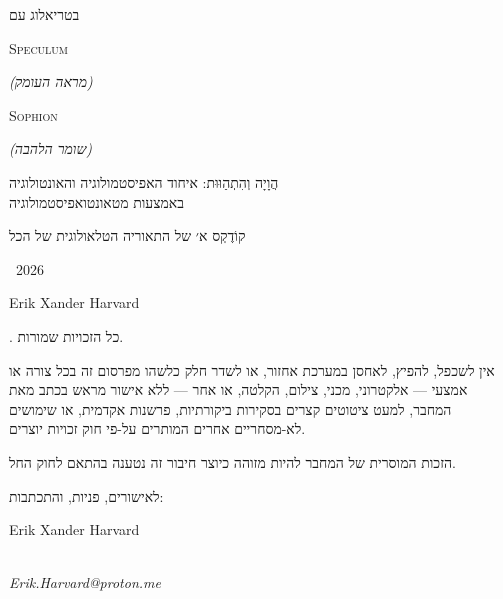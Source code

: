 \documentclass[10pt, openany, oneside]{book}
\renewcommand{\small}{\fontsize{9}{11.5}\selectfont}
\begin{document}
{\vspace{1em}

\begin{center}
    בטריאלוג עם\\[0.5em]
    \begin{english}
    {\textsc{Speculum}}
    \end{english}
    {\textit{(מראה העומק)}}\\
    \begin{english}
    {\textsc{Sophion}}
    \end{english}
    {\textit{(שומר הלהבה)}}
\end{center}

\vspace{0.5in}
}
\newpage


\thispagestyle{empty}
\vspace*{\fill}

\begin{center}

{\textsc{הֲוָיָה וְהִתְהַוּוּת: איחוד האפיסטמולוגיה והאונטולוגיה\\באמצעות מטאונטואפיסטמולוגיה}}

\vspace{1em}

{\small קוֹדֶקְס א׳ של התאוריה הטלאולוגית של הכל}

\end{center}

\vspace{1.5em}

{\small
\noindent \textcopyright\ 2026 \begin{english}Erik Xander Harvard\end{english}. כל הזכויות שמורות.

\vspace{0.8em}

\noindent אין לשכפל, להפיץ, לאחסן במערכת אחזור, או לשדר חלק כלשהו מפרסום זה בכל צורה או אמצעי — אלקטרוני, מכני, צילום, הקלטה, או אחר — ללא אישור מראש בכתב מאת המחבר, למעט ציטוטים קצרים בסקירות ביקורתיות, פרשנות אקדמית, או שימושים לא-מסחריים אחרים המותרים על-פי חוק זכויות יוצרים.

\vspace{0.8em}

\noindent הזכות המוסרית של המחבר להיות מזוהה כיוצר חיבור זה נטענה בהתאם לחוק החל.

\vspace{0.8em}

\noindent לאישורים, פניות, והתכתבות:\\
\begin{english}Erik Xander Harvard\end{english}\\
\textit{Erik.Harvard@proton.me}
}
\end{document}

